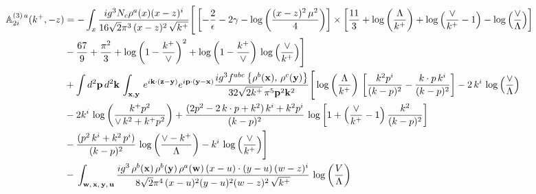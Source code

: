 \documentclass[aps,prd,amsmath,amssymb,nofootinbib]{revtex4-2}
\def\mf#1{\mathbb{#1}}
\def\v#1{\mathbf{#1}}
\numberwithin{equation}{section}
\begin{document}
\begin{align}
   \mf{A}^{(3)\,a}_{2i}(k^{+},-z)  & =  -\int_{x} \frac{ig^{3}N_{c}\rho^{a}(x)(x-z)^{i}}{16\sqrt{2}\pi^{3}\,(x-z)^{2}\,\sqrt{k^{+}}}\Bigg[\left[-\frac{2}{\epsilon}-2\gamma -\log{\left(\frac{(x-z)^{2}\,\mu^{2}}{4}\right)}\right]\times \left[\frac{11}{3}+ \log{\left(\frac{\Lambda}{k^{+}}\right)}+\log{\left(\frac{\vee}{k^{+}}-1\right)}-\log{\left(\frac{\vee}{\Lambda}\right)}\right]\notag \\ & -\frac{67}{9}+\frac{\pi^{2}}{3} + \log{\left(1-\frac{k^{+}}{\vee}\right)}^{2}+\log{\left(1-\frac{k^{+}}{\vee}\right)}\,\log{\left(\frac{\vee}{k^{+}}\right)}\Bigg] \notag \\ & +\int d^{2}\mathbf{p}\,d^{2}\mathbf{k}\,\int_{\v{x},\v{y}}\, e^{i\v{k}\cdot (\v{z}-\v{y})} e^{i\v{p}\cdot (\v{y}-\v{x})}\frac{ig^{3}f^{abc}\left\{ \rho^{b}(\mathbf{x}),\,\rho^{c}(\mathbf{y})\right\}}{32\sqrt{2k^{+}}\,\pi^{5}\mathbf{p}^{2}\mathbf{k}^{2}}\Bigg[\log{\left(\frac{\Lambda}{k^{+}}\right)}\,\left[\frac{k^{2}p^{i}}{(k-p)^{2}}-\frac{k\cdot p\,k^{i}}{(k-p)^{2}}\right]-2\,k^{i}\,\log{\left(\frac{\vee}{\Lambda}\right)}\notag \\ & -2k^{i}\,\log{\left(\frac{k^{+}p^{2}}{\vee\, k^{2}+k^{+}p^{2}}\right)}+\frac{(2p^{2}-2\,k\cdot p + k^{2})\,k^{i} + k^{2}p^{i}}{(k-p)^{2}}\, \log{\left[1+\left(\frac{\vee}{k^{+}}-1\right)\frac{k^{2}}{(k-p)^{2}}\right]}\notag \\ & - \frac{(p^{2}\,k^{i}+k^{2}\,p^{i})}{(k-p)^{2}}\, \log{\left(\frac{\vee - k^{+}}{\Lambda}\right)}-k^{i}\, \log{\left(\frac{\vee}{k^{+}}\right)}\Bigg]\notag \\ & -\,\int_{\mathbf{w},\, \mathbf{x},\, \mathbf{y},\, \mathbf{u}}\frac{ig^{3}\,\rho^{b}(\mathbf{x})\,\rho^{b}(\mathbf{y})\,\rho^{a}(\mathbf{w})\, (x-u)\cdot (y-u)\,(w-z)^{i}}{8\sqrt{2}\pi^{4}\,(x-u)^{2}(y-u)^{2}(w-z)^{2}\,\sqrt{k^{+}}}\,\log{\left(\frac{V}{\Lambda}\right)} %
\end{align}
\end{document}

